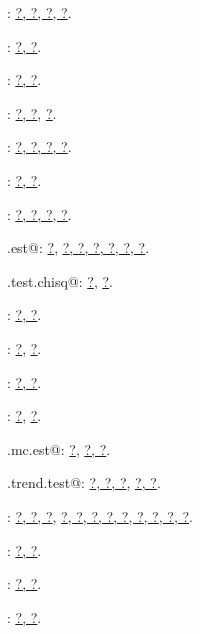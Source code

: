 \documentclass[reqno]{amsart}
\renewcommand{\NWlink}[2]{\hyperlink{#1}{#2}}
\begin{document}
{\small\begin{list}{}{\setlength{\itemsep}{-\parsep}\setlength{\itemindent}{-\leftmargin}}
\item \verb@CalcMarginals@: \underline{\NWlink{nuweb?}{?}}\NWlink{nuweb?}{, ?}\NWlink{nuweb?}{, ?}\NWlink{nuweb?}{, ?}.
\item \verb@CalcTopD@: \underline{\NWlink{nuweb?}{?}}\NWlink{nuweb?}{, ?}.
\item \verb@Comb@: \underline{\NWlink{nuweb?}{?}}\NWlink{nuweb?}{, ?}.
\item \verb@DownUpMatrix@: \NWlink{nuweb?}{?}\NWlink{nuweb?}{, ?}, \underline{\NWlink{nuweb?}{?}}.
\item \verb@HyperTable@: \underline{\NWlink{nuweb?}{?}}\NWlink{nuweb?}{, ?}\NWlink{nuweb?}{, ?}\NWlink{nuweb?}{, ?}.
\item \verb@IndexVectorC@: \underline{\NWlink{nuweb?}{?}}\NWlink{nuweb?}{, ?}.
\item \verb@makeSmatrix@: \underline{\NWlink{nuweb?}{?}}\NWlink{nuweb?}{, ?}\NWlink{nuweb?}{, ?}\NWlink{nuweb?}{, ?}.
\item \verb@mc.est@: \NWlink{nuweb?}{?}, \underline{\NWlink{nuweb?}{?}}\NWlink{nuweb?}{, ?}\NWlink{nuweb?}{, ?}\NWlink{nuweb?}{, ?}\NWlink{nuweb?}{, ?}\NWlink{nuweb?}{, ?}.
\item \verb@mc.test.chisq@: \NWlink{nuweb?}{?}, \underline{\NWlink{nuweb?}{?}}.
\item \verb@NegLogLik@: \underline{\NWlink{nuweb?}{?}}\NWlink{nuweb?}{, ?}.
\item \verb@NOSTASOT@: \NWlink{nuweb?}{?}, \underline{\NWlink{nuweb?}{?}}.
\item \verb@ReprodEstimates@: \underline{\NWlink{nuweb?}{?}}\NWlink{nuweb?}{, ?}.
\item \verb@ReprodISDM@: \NWlink{nuweb?}{?}, \underline{\NWlink{nuweb?}{?}}.
\item \verb@SO.mc.est@: \NWlink{nuweb?}{?}, \underline{\NWlink{nuweb?}{?}}\NWlink{nuweb?}{, ?}.
\item \verb@SO.trend.test@: \NWlink{nuweb?}{?}\NWlink{nuweb?}{, ?}\NWlink{nuweb?}{, ?}, \underline{\NWlink{nuweb?}{?}}\NWlink{nuweb?}{, ?}.
\item \verb@soControl@: \NWlink{nuweb?}{?}\NWlink{nuweb?}{, ?}\NWlink{nuweb?}{, ?}, \underline{\NWlink{nuweb?}{?}}\NWlink{nuweb?}{, ?}\NWlink{nuweb?}{, ?}\NWlink{nuweb?}{, ?}\NWlink{nuweb?}{, ?}\NWlink{nuweb?}{, ?}\NWlink{nuweb?}{, ?}\NWlink{nuweb?}{, ?}\NWlink{nuweb?}{, ?}.
\item \verb@UpdateMarginals@: \underline{\NWlink{nuweb?}{?}}\NWlink{nuweb?}{, ?}.
\item \verb@UpdateQ@: \underline{\NWlink{nuweb?}{?}}\NWlink{nuweb?}{, ?}.
\item \verb@UpdateReprodQ@: \underline{\NWlink{nuweb?}{?}}\NWlink{nuweb?}{, ?}.
\end{list}}
\end{document}
